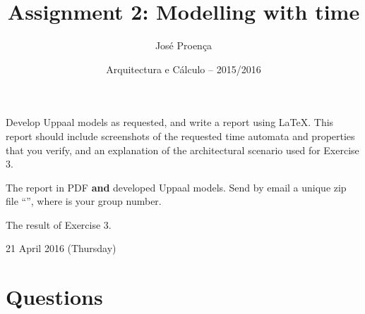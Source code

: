 \documentclass[11pt]{article}
\date{Arquitectura e C\'alculo -- 2015/2016}
\begin{document}
 
 
\title{Assignment 2: Modelling with time}
\author{Jos\'{e} Proen\c{c}a}
 
\maketitle

 Develop Uppaal models as requested, and write a report using LaTeX. This report should include screenshots of the requested time automata and properties that you verify, and an explanation of the architectural scenario used for Exercise 3.

 The report in PDF \textbf{and} developed Uppaal models. Send by email a unique zip file ``'', where  is your group number.

 The result of Exercise 3.

 21 April 2016 (Thursday)
 
\section*{Questions}

%
%
%
%
%
\end{document}
